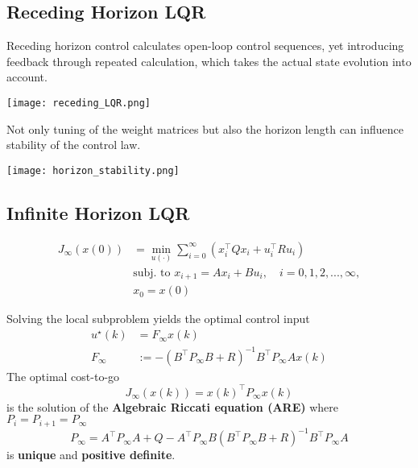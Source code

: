 \subsection{Receding Horizon LQR}

Receding horizon control calculates open-loop control sequences, yet introducing feedback through repeated calculation, which takes the actual state evolution into account.

\begin{center}
    \texttt{[image: receding\_LQR.png]}
\end{center}

\newpar{}

Not only tuning of the weight matrices but also the horizon length can influence stability of the control law.

\begin{center}
    \texttt{[image: horizon\_stability.png]}
\end{center}

\subsection{Infinite Horizon LQR}


\begin{align*}
    J_\infty(x(0)) & =\min_{u(\cdot)}\sum_{i=0}^\infty\left(x_i^\top Qx_i+u_i^\top Ru_i\right) \\
                   & \text{subj.\ to }x_{i+1}=Ax_i+Bu_i,\quad i=0,1,2,...,\infty,              \\
                   & x_0=x(0)
\end{align*}

\newpar{}

Solving the local subproblem yields the optimal control input
\begin{align*}
    u^\star(k) & = F_\infty x(k)                                       \\
    F_\infty   & := -{(B^\top P_\infty B+R)}^{-1}B^\top P_\infty Ax(k)
\end{align*}
The optimal cost-to-go
\begin{equation*}
    J_\infty(x(k))=x(k)^\top P_\infty x(k)
\end{equation*}
is the solution of the \textbf{Algebraic Riccati equation (ARE)} where $P_i = P_{i+1} = P_{\infty}$
\begin{equation*}
    P_\infty=A^\top P_\infty A+Q-A^\top P_\infty B{(B^\top P_\infty B+R)}^{-1}B^\top P_\infty A
\end{equation*}
is \textbf{unique} and \textbf{positive definite}.

